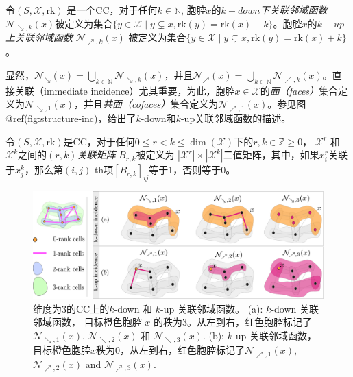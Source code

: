 \documentclass[
  12pt,
]{krantz}
\begin{document}
\label{filtered-incidence}
令\((S,\mathcal{X}, \mbox{rk})\) 是一个CC，对于任何\(k\in\mathbb{N}\),
胞腔\(x\)的\emph{\(k-down\)下关联邻域函数}
\(\mathcal{N}_{\searrow,k}(x)\)被定义为集合\(\{ y\in \mathcal{X} \mid y \subsetneq x, \mbox{rk}(y)=\mbox{rk}(x)-k \}\)。胞腔\(x\)的\emph{\(k-up\)上关联邻域函数}
\(\mathcal{N}_{\nearrow,k}(x)\)
被定义为集合\(\{ y\in \mathcal{X} \mid y \subsetneq x,\mbox{rk}(y)=\mbox{rk}(x)+k \}\)。

显然，\(\mathcal{N}_{\searrow}(x)= \bigcup_{k\in \mathbb{N}} \mathcal{N}_{\searrow,k}(x)\)，并且\(\mathcal{N}_{\nearrow}(x)= \bigcup_{k\in\mathbb{N}} \mathcal{N}_{\nearrow,k}(x)\)。直接关联（immediate
incidence）尤其重要，为此，胞腔\(x \in \mathcal{X}\)的\emph{面（faces）}集合定义为\(\mathcal{N}_{\searrow,1} (x)\)，并且\emph{共面（cofaces）}集合定义为\(\mathcal{N}_{\nearrow,1} (x)\)。参见图@ref(fig:structure-inc)，给出了\(k\)-down和\(k\)-up关联邻域函数的描述。

\label{inc-mat}
令\((S,\mathcal{X}, \mbox{rk})\)是CC，对于任何\(0\leq r<k \leq \dim(\mathcal{X})\)下的\(r,k \in \mathbb{Z}{\ge 0}\)，
\(\mathcal{X}^{r}\) 和 \(\mathcal{X}^{k}\)之间的\emph{\((r,k)\)关联矩阵}
\(B_{r,k}\)被定义为
\(|\mathcal{X}^r| \times |\mathcal{X}^k|\)二值矩阵，其中，如果\(x^r_i\)关联于\(x^k_j\)，那么第\((i, j)\)-th项\([B_{r,k}]_{ij}\)等于1，否则等于0。

\begin{figure}

{\centering \includegraphics{figures/structure_inc} 

}

\caption{维度为3的CC上的$k$-down 和 $k$-up 关联邻域函数。 (a): $k$-down 关联邻域函数， 目标橙色胞腔 $x$ 的秩为3。从左到右，红色胞腔标记了$\mathcal{N}_{\searrow,1}(x)$, $\mathcal{N}_{\searrow,2}(x)$ 和 $\mathcal{N}_{\searrow,3}(x)$. (b): $k$-up 关联邻域函数，目标橙色胞腔$x$秩为0，从左到右，红色胞腔标记了$\mathcal{N}_{\nearrow,1}(x)$, $\mathcal{N}_{\nearrow,2}(x)$ and $\mathcal{N}_{\nearrow,3}(x)$.}\label{fig:structure-inc}
\end{figure}
\end{document}
